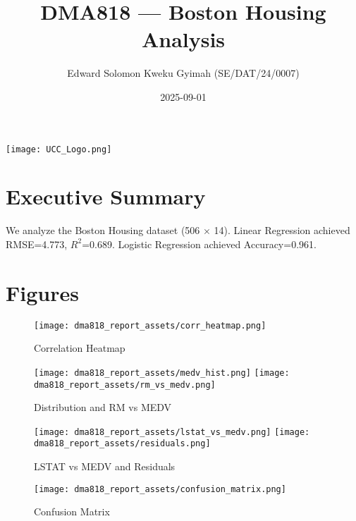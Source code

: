 \documentclass[11pt,a4paper]{article}
\title{DMA818 --- Boston Housing Analysis}
\author{Edward Solomon Kweku Gyimah (SE/DAT/24/0007)}
\date{2025-09-01}
\begin{document}
\begin{center}
\texttt{[image: UCC\_Logo.png]}\\
\end{center}
\maketitle

\section*{Executive Summary}
We analyze the Boston Housing dataset (506 $\times$ 14).
Linear Regression achieved RMSE=4.773, $R^2$=0.689.
Logistic Regression achieved Accuracy=0.961.

\section*{Figures}
\begin{figure}[h]
\centering
\texttt{[image: dma818\_report\_assets/corr\_heatmap.png]}
\caption{Correlation Heatmap}
\end{figure}

\begin{figure}[h]
\centering
\texttt{[image: dma818\_report\_assets/medv\_hist.png]}
\texttt{[image: dma818\_report\_assets/rm\_vs\_medv.png]}
\caption{Distribution and RM vs MEDV}
\end{figure}

\begin{figure}[h]
\centering
\texttt{[image: dma818\_report\_assets/lstat\_vs\_medv.png]}
\texttt{[image: dma818\_report\_assets/residuals.png]}
\caption{LSTAT vs MEDV and Residuals}
\end{figure}

\begin{figure}[h]
\centering
\texttt{[image: dma818\_report\_assets/confusion\_matrix.png]}
\caption{Confusion Matrix}
\end{figure}
\end{document}
